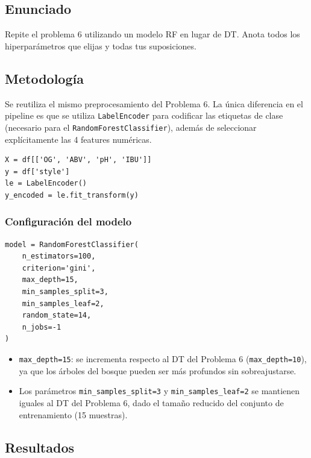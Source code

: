 \documentclass{article}
\begin{document}
\subsection{Enunciado}

Repite el problema 6 utilizando un modelo RF en lugar de DT. Anota todos los hiperparámetros que elijas y todas tus suposiciones.

\subsection{Metodología}

Se reutiliza el mismo preprocesamiento del Problema 6. La única diferencia en el pipeline es que se utiliza \texttt{LabelEncoder} para codificar las etiquetas de clase (necesario para el \texttt{RandomForestClassifier}), además de seleccionar explícitamente las 4 features numéricas.

\begin{lstlisting}
X = df[['OG', 'ABV', 'pH', 'IBU']]
y = df['style']
le = LabelEncoder()
y_encoded = le.fit_transform(y)
\end{lstlisting}

\subsubsection{Configuración del modelo}

\begin{lstlisting}
model = RandomForestClassifier(
    n_estimators=100,
    criterion='gini',
    max_depth=15,
    min_samples_split=3,
    min_samples_leaf=2,
    random_state=14,
    n_jobs=-1
)
\end{lstlisting}

\begin{itemize}
    \item \texttt{max\_depth=15}: se incrementa respecto al DT del Problema 6 (\texttt{max\_depth=10}), ya que los árboles del bosque pueden ser más profundos sin sobreajustarse.
    \item Los parámetros \texttt{min\_samples\_split=3} y \texttt{min\_samples\_leaf=2} se mantienen iguales al DT del Problema 6, dado el tamaño reducido del conjunto de entrenamiento (15 muestras).
\end{itemize}

\subsection{Resultados}
\end{document}
